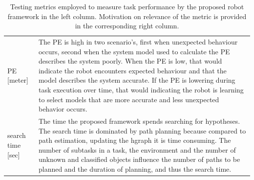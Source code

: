 \noindent
\begin{table}[H]
\caption{Testing metrics employed to measure task performance by the proposed robot framework in the left column. Motivation on relevance of the metric is provided in the corresponding right column.}\label{table:proposed_test_metrics}
\centering
\begin{tabular}%
  {>{\raggedright\arraybackslash}p{}%
   >{\raggedright\arraybackslash}p{}}
\acl{PE} [meter] &  The \ac{PE} is high in two scenario's, first when unexpected behaviour occurs, second when the system model used to calculate the \ac{PE} describes the system poorly. When the \ac{PE} is low, that would indicate the robot encounters expected behaviour and that the model describes the system accurate. If the \ac{PE} is lowering during task execution over time, that would indicating the robot is learning to select models that are more accurate and less unexpected behavior occurs.\\
search time [sec]& The time the proposed framework spends searching for hypotheses. The search time is dominated by path planning because compared to path estimation, updating the \ac{hgraph} it is time consuming. The number of subtasks in a task, the environment and the number of unknown and classified objects influence the number of paths to be planned and the duration of planning, and thus the search time.\\ 

\end{tabular}
\end{table}
